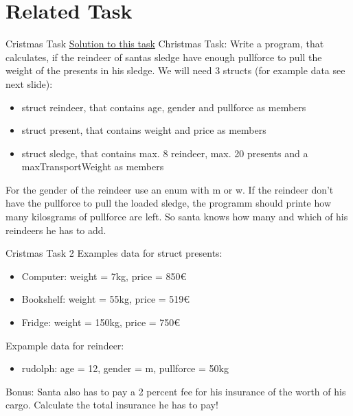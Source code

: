 \section{Related Task}
\begin{frame}{Cristmas Task}
    \href{https://github.com/scholzp/c-lessons/tree/master/solutions/Santas_sledge}{Solution to this task}
    \newline
    Christmas Task:
    Write a program, that calculates, if the reindeer of santas sledge have enough pullforce to pull the weight of the presents in his sledge.
    We will need 3 structs (for example data see next slide):
    \begin{itemize}
     \item struct reindeer, that contains age, gender and pullforce as members
     \item struct present, that contains weight and price as members
     \item struct sledge, that contains max. 8 reindeer, max. 20 presents and a maxTransportWeight as members
    \end{itemize}
    For the gender of the reindeer use an enum with m or w.\newline\newline
    If the reindeer don't have the pullforce to pull the loaded sledge, the programm should printe how many kilosgrams of pullforce are left. So santa knows how many and which of his reindeers he has to add.

\end{frame}

\begin{frame}{Cristmas Task 2}
    Examples data for struct presents:
    \begin{itemize}
     \item Computer: weight = 7kg, price = 850€
     \item Bookshelf: weight = 55kg, price = 519€
     \item Fridge: weight = 150kg, price = 750€
    \end{itemize}
    Expample data for reindeer:
    \begin{itemize}
     \item rudolph: age = 12, gender = m, pullforce = 50kg
    \end{itemize}
    Bonus: Santa also has to pay a 2 percent fee for his insurance of the worth of his cargo. Calculate the total insurance he has to pay!
\end{frame}


